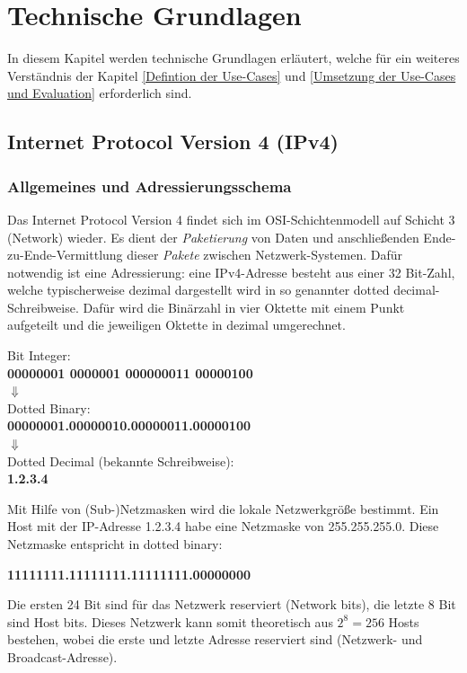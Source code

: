 \chapter{Technische Grundlagen} \label{Technische_Grundlagen}

In diesem Kapitel werden technische Grundlagen erläutert, welche für ein weiteres Verständnis der Kapitel \ref{Defintion der Use-Cases} und \ref{Umsetzung der Use-Cases und Evaluation} erforderlich sind.
\section{Internet Protocol Version 4 (IPv4)} \label{ipv4}

\subsection{Allgemeines und Adressierungsschema}
Das Internet Protocol Version 4 findet sich im \gls{OSI-Schichtenmodell} auf Schicht 3 (Network) wieder\cite{itu1994}. Es dient der \textit{Paketierung} von Daten und anschließenden Ende-zu-Ende-Vermittlung dieser \textit{Pakete} zwischen Netzwerk-Systemen. Dafür notwendig ist eine Adressierung: eine IPv4-Adresse besteht aus einer 32 Bit-Zahl, welche typischerweise dezimal dargestellt wird in so genannter \glqq dotted decimal\grqq{}-Schreibweise. Dafür wird die Binärzahl in vier Oktette mit einem Punkt aufgeteilt und die jeweiligen Oktette in dezimal umgerechnet.

{ Bit Integer:\\
\textbf{00000001 0000001 000000011 00000100}\\
$\Downarrow$\\
\glqq Dotted Binary\grqq{}:\\
\textbf{00000001.00000010.00000011.00000100}\\
$\Downarrow$\\
Dotted Decimal (bekannte Schreibweise):\\
{\textbf{1.2.3.4}}\par}

Mit Hilfe von (Sub-)Netzmasken wird die lokale Netzwerkgröße bestimmt. Ein Host mit der IP-Adresse 1.2.3.4 habe eine Netzmaske von 255.255.255.0. Diese Netzmaske entspricht in dotted binary:

{\centering\textbf{11111111.11111111.11111111.00000000}\par}

Die ersten 24 Bit sind für das Netzwerk reserviert (Network bits), die letzte 8 Bit sind Host bits. Dieses Netzwerk kann somit theoretisch aus $2^8 = 256$ Hosts bestehen, wobei die erste und letzte Adresse reserviert sind (Netzwerk- und Broadcast-Adresse).

